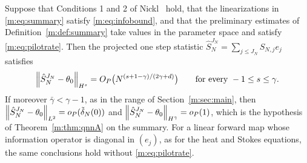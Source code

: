 \begin{proposition}\label{m:prop:sumrate}
Suppose that Conditions 1 and 2 of Nickl~\cite{nicklbvm2024} hold, that the linearizations in \eqref{m:eq:summary} satisfy \eqref{m:eq:infobound}, and that the preliminary estimates of Definition~\ref{m:def:summary} take values in the parameter space and satisfy \eqref{m:eq:pilotrate}. Then the projected one step statistic $\hat S^{J_N}_N=\sum_{j\le J_N}S_{N,j}e_j$ satisfies
\begin{equation}\label{m:eq:sumrate}
\left\|\hat S^{J_N}_N-\theta_0\right\|_{H^s}=O_P\big(N^{(s+1-\gamma)/(2\gamma+d)}\big)\qquad\text{for every }-1\le s\le\gamma .
\end{equation}
If moreover $\bar\gamma<\gamma-1$, as in the range of Section~\ref{m:sec:main}, then $\left\|\hat S^{J_N}_N-\theta_0\right\|_{L^2}=o_P(\tilde\delta_N(0))$ and $\left\|\hat S^{J_N}_N-\theta_0\right\|_{H^{\bar\gamma}}=o_P(1)$, which is the hypothesis of Theorem~\ref{m:thm:qnnA} on the summary. For a linear forward map whose information operator is diagonal in $(e_j)$, as for the heat and Stokes equations, the same conclusions hold without \eqref{m:eq:pilotrate}.
\end{proposition}

